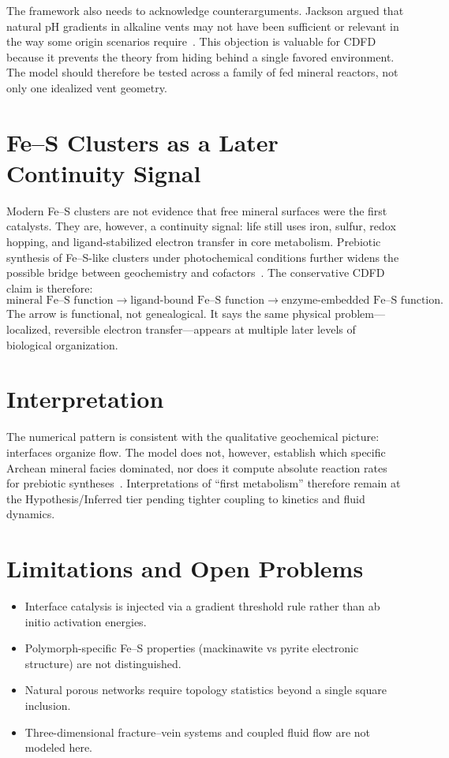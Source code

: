 \documentclass[11pt,a4paper]{article}
\begin{document}
The framework also needs to acknowledge counterarguments. Jackson argued that natural pH gradients in alkaline vents may not have been sufficient or relevant in the way some origin scenarios require~\cite{Jackson2016}. This objection is valuable for CDFD because it prevents the theory from hiding behind a single favored environment. The model should therefore be tested across a family of fed mineral reactors, not only one idealized vent geometry.

\section{Fe--S Clusters as a Later Continuity Signal}
Modern Fe--S clusters are not evidence that free mineral surfaces were the first catalysts. They are, however, a continuity signal: life still uses iron, sulfur, redox hopping, and ligand-stabilized electron transfer in core metabolism. Prebiotic synthesis of Fe--S-like clusters under photochemical conditions further widens the possible bridge between geochemistry and cofactors~\cite{Bonfio2017}. The conservative CDFD claim is therefore:
\begin{equation}
\text{mineral Fe--S function} \rightarrow
\text{ligand-bound Fe--S function}
\rightarrow
\text{enzyme-embedded Fe--S function}.
\end{equation}
The arrow is functional, not genealogical. It says the same physical problem---localized, reversible electron transfer---appears at multiple later levels of biological organization.

\section{Interpretation}
The numerical pattern is consistent with the qualitative geochemical picture: interfaces organize flow. The model does not, however, establish which specific Archean mineral facies dominated, nor does it compute absolute reaction rates for prebiotic syntheses~\cite{Huber1997,Wachtershauser1988}. Interpretations of ``first metabolism'' therefore remain at the Hypothesis/Inferred tier pending tighter coupling to kinetics and fluid dynamics.

\section{Limitations and Open Problems}
\begin{itemize}
\item Interface catalysis is injected via a gradient threshold rule rather than ab initio activation energies.
\item Polymorph-specific Fe--S properties (mackinawite vs pyrite electronic structure) are not distinguished.
\item Natural porous networks require topology statistics beyond a single square inclusion.
\item Three-dimensional fracture--vein systems and coupled fluid flow are not modeled here.
\end{itemize}
\end{document}
